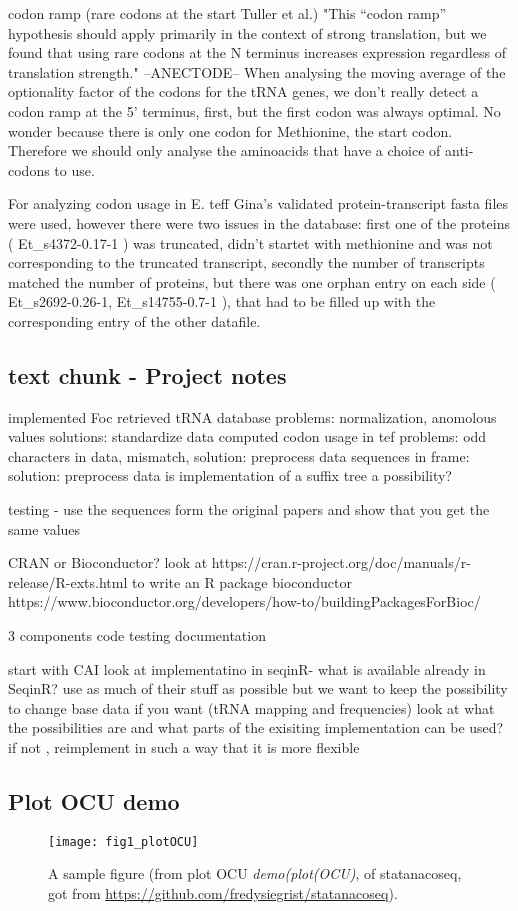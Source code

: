 codon ramp (rare codons at the start Tuller et al.) "This “codon ramp” hypothesis should apply primarily in the context of strong translation, but we found that using rare codons at the N terminus increases expression regardless of translation strength." --ANECTODE-- When analysing the moving average of the optionality factor of the codons for the tRNA genes, we don't really detect a codon ramp at the 5' terminus, first, but the first codon was always optimal. No wonder because there is only one codon for Methionine, the start codon. Therefore we should only analyse the aminoacids that have a choice of anti-codons to use.  

For analyzing codon usage in E. teff Gina's validated protein-transcript fasta files were used, however there were two issues in the database: 
first one of the proteins (
Et\_s4372-0.17-1
) was truncated, didn't startet with methionine and was not corresponding to the truncated transcript, secondly the number of transcripts matched the number of proteins, but there was one orphan entry on each side (
Et\_s2692-0.26-1, Et\_s14755-0.7-1
), that had to be filled up with the corresponding entry of the other datafile. 


\subsection{text chunk - Project notes}

implemented Foc
retrieved tRNA database problems: normalization, anomolous values solutions: standardize data
computed codon usage in tef problems: odd characters in data, mismatch, solution: preprocess data
sequences in frame: solution: preprocess data
is implementation of a suffix tree a possibility?



testing - use the sequences form the original papers and show that you get the same values

CRAN or Bioconductor?
look at https://cran.r-project.org/doc/manuals/r-release/R-exts.html to write an R package
bioconductor  https://www.bioconductor.org/developers/how-to/buildingPackagesForBioc/

3 components
  code
  testing
  documentation

start with CAI
 look at implementatino in seqinR-  what is available already in SeqinR? use as much of their stuff as possible but we want to keep the possibility to change base data if you want (tRNA mapping and frequencies)
 look at what the possibilities are and what parts of the exisiting implementation can be used?
 if not , reimplement in such a way that it is more flexible 


\subsection{Plot OCU demo}
\begin{figure}[tb] 
\centering 
\texttt{[image: fig1\_plotOCU]} 
\caption[A sample figure from demo plotOCU]{A sample figure (from plot OCU \emph{demo(plot(OCU)}, of statanacoseq, got from \url{https://github.com/fredysiegrist/statanacoseq}).}
\label{fig:plotOCU} 
\end{figure}
